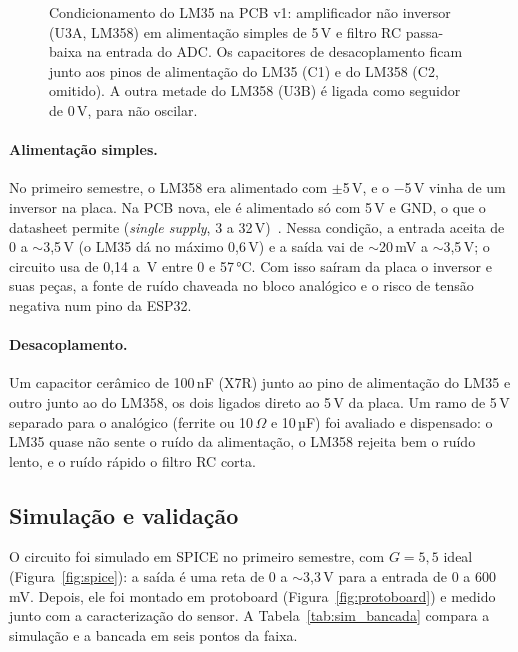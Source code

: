 \begin{figure}[H]
\centering
\resizebox{0.95\linewidth}{!}{}
\caption{Condicionamento do LM35 na PCB v1: amplificador não inversor (U3A, LM358) em
alimentação simples de 5\,V e filtro RC passa-baixa na entrada do ADC. Os capacitores de
desacoplamento ficam junto aos pinos de alimentação do LM35 (C1) e do LM358 (C2, omitido).
A outra metade do LM358 (U3B) é ligada como seguidor de 0\,V, para não oscilar.}
\label{fig:circuito_lm35}
\end{figure}

\paragraph{Alimentação simples.} No primeiro semestre, o LM358 era alimentado com $\pm$5\,V,
e o $-$5\,V vinha de um inversor na placa. Na PCB nova, ele é alimentado só com 5\,V e GND,
o que o datasheet permite (\textit{single supply}, 3 a 32\,V)~\cite{lm358}. Nessa condição,
a entrada aceita de 0 a $\sim$3,5\,V (o LM35 dá no máximo 0,6\,V) e a saída vai de
$\sim$20\,mV a $\sim$3,5\,V; o circuito usa de 0,14 a \lmVmaxCadeia\,V entre 0 e 57\,°C. Com
isso saíram da placa o inversor e suas peças, a fonte de ruído chaveada no bloco analógico e
o risco de tensão negativa num pino da ESP32.

\paragraph{Desacoplamento.} Um capacitor cerâmico de 100\,nF (X7R) junto ao pino de
alimentação do LM35 e outro junto ao do LM358, os dois ligados direto ao 5\,V da placa. Um
ramo de 5\,V separado para o analógico (ferrite ou 10\,$\Omega$ e 10\,µF) foi avaliado e
dispensado: o LM35 quase não sente o ruído da alimentação, o LM358 rejeita bem o ruído lento,
e o ruído rápido o filtro RC corta.

\subsection{Simulação e validação}\label{sec:validacao_lm358}

O circuito foi simulado em SPICE no primeiro semestre, com $G = 5{,}5$ ideal
(Figura~\ref{fig:spice}): a saída é uma reta de 0 a $\sim$3,3\,V para a entrada de 0 a 600\,mV.
Depois, ele foi montado em protoboard (Figura~\ref{fig:protoboard}) e medido junto com a
caracterização do sensor. A Tabela~\ref{tab:sim_bancada} compara a simulação e a bancada em
seis pontos da faixa.

